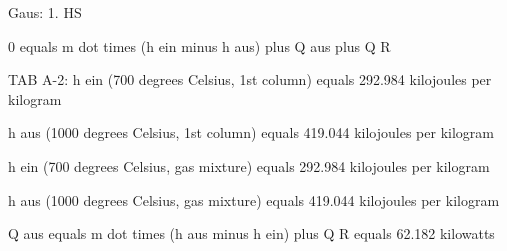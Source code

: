 Gaus: 1. HS

0 equals m dot times (h ein minus h aus) plus Q aus plus Q R

TAB A-2: h ein (700 degrees Celsius, 1st column) equals 292.984 kilojoules per kilogram

h aus (1000 degrees Celsius, 1st column) equals 419.044 kilojoules per kilogram

h ein (700 degrees Celsius, gas mixture) equals 292.984 kilojoules per kilogram

h aus (1000 degrees Celsius, gas mixture) equals 419.044 kilojoules per kilogram

Q aus equals m dot times (h aus minus h ein) plus Q R equals 62.182 kilowatts
